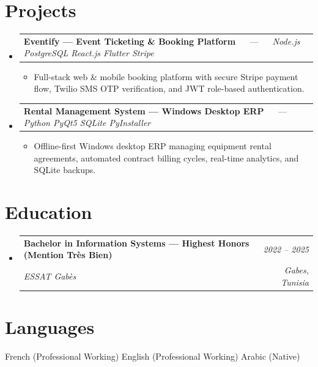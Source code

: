 \documentclass[letterpaper,9pt]{article}
\makeatletter
\newcommand{\resumeItem}[1]{\item\small{#1}}
\newcommand{\resumeSubheading}[4]{
  \vspace{-1pt}\item
  \begin{tabular*}{0.97\textwidth}[t]{l@{\extracolsep{\fill}}r}
    \textbf{#1} & \textit{\color{greytext}#2} \\
    \textit{\small\color{greytext} #3} & \textit{\small\color{greytext} #4}
  \end{tabular*}\vspace{-2pt}
}
\newcommand{\resumeProjectHeading}[2]{
  \item
  \begin{tabular*}{0.97\textwidth}{l@{\extracolsep{\fill}}r}
    \small #1 & #2
  \end{tabular*}\vspace{-1pt}
}
\newcommand{\resumeSubHeadingListStart}{\begin{itemize}[leftmargin=0.18in, label={}, itemsep=1.2pt, topsep=2.5pt, parsep=0pt]}
\newcommand{\resumeSubHeadingListEnd}{\end{itemize}\vspace{-2pt}}
\newcommand{\resumeProjectListStart}{\begin{itemize}[leftmargin=0.24in, label={}, itemsep=0.9pt, topsep=1.2pt, parsep=0pt]}
\newcommand{\resumeProjectListEnd}{\end{itemize}\vspace{-2pt}}
\makeatother
\begin{document}
\section{Projects}
\resumeSubHeadingListStart

  \resumeProjectHeading{\textbf{Eventify --- Event Ticketing \& Booking Platform} $\quad$ --- $\quad$ \emph{\color{greytext}Node.js \textperiodcentered{} PostgreSQL \textperiodcentered{} React.js \textperiodcentered{} Flutter \textperiodcentered{} Stripe}}{}
    \resumeProjectListStart
      \resumeItem{Full-stack web \& mobile booking platform with secure Stripe payment flow, Twilio SMS OTP verification, and JWT role-based authentication.}
    \resumeProjectListEnd

  \resumeProjectHeading{\textbf{Rental Management System --- Windows Desktop ERP} $\quad$ --- $\quad$ \emph{\color{greytext}Python \textperiodcentered{} PyQt5 \textperiodcentered{} SQLite \textperiodcentered{} PyInstaller}}{}
    \resumeProjectListStart
      \resumeItem{Offline-first Windows desktop ERP managing equipment rental agreements, automated contract billing cycles, real-time analytics, and SQLite backups.}
    \resumeProjectListEnd

\resumeSubHeadingListEnd\vspace{-3pt}

\section{Education}
\resumeSubHeadingListStart
  \resumeSubheading{Bachelor in Information Systems --- Highest Honors (Mention Très Bien)}{2022 -- 2025}{ESSAT Gabès}{Gabes, Tunisia}
\resumeSubHeadingListEnd\vspace{-1pt}

\section{Languages}
\begin{itemize}[leftmargin=0.18in, label={}, topsep=2pt, itemsep=1pt, parsep=0pt]
\footnotesize{
  \item French (Professional Working) \textperiodcentered{} English (Professional Working) \textperiodcentered{} Arabic (Native)
}
\end{itemize}
\end{document}

